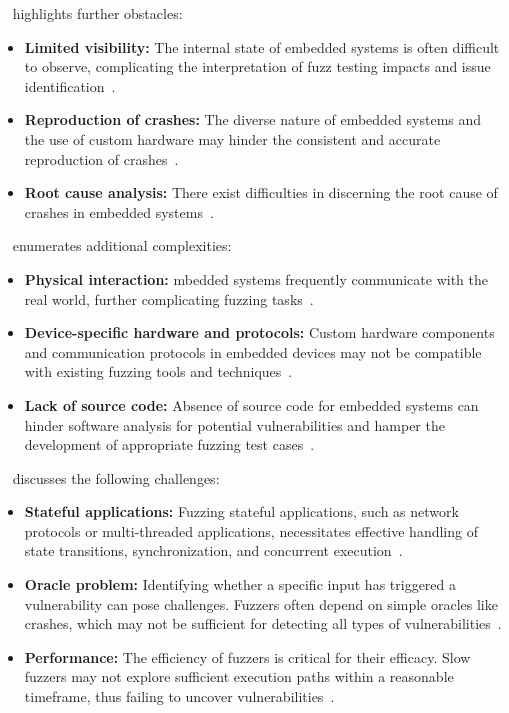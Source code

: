 ~ highlights further obstacles:
\begin{itemize}
\item \textbf{Limited visibility:} The internal state of embedded systems is often difficult to observe, complicating the interpretation of fuzz testing impacts and issue identification~\cite{muench2018you}.
\item \textbf{Reproduction of crashes:} The diverse nature of embedded systems and the use of custom hardware may hinder the consistent and accurate reproduction of crashes~\cite{muench2018you}.
\item \textbf{Root cause analysis:} There exist difficulties in discerning the root cause of crashes in embedded systems~\cite{muench2018you}.
\end{itemize}

~ enumerates additional complexities:
\begin{itemize}
\item \textbf{Physical interaction:} mbedded systems frequently communicate with
the real world, further complicating fuzzing tasks~\cite{eisele2022embedded}.
\item \textbf{Device-specific hardware and protocols:} Custom hardware components and communication protocols in embedded devices may not be compatible with existing fuzzing tools and techniques~\cite{eisele2022embedded}.
\item \textbf{Lack of source code:} Absence of source code for embedded systems can hinder software analysis for potential vulnerabilities and hamper the development of appropriate fuzzing test cases~\cite{eisele2022embedded}.
\end{itemize}

~ discusses the following challenges:
\begin{itemize}
\item \textbf{Stateful applications:} Fuzzing stateful applications, such as network protocols or multi-threaded applications, necessitates effective handling of state transitions, synchronization, and concurrent execution~\cite{manes2019art}.
\item \textbf{Oracle problem:} Identifying whether a specific input has triggered a vulnerability can pose challenges. Fuzzers often depend on simple oracles like crashes, which may not be sufficient for detecting all types of vulnerabilities~\cite{manes2019art}.
\item \textbf{Performance:} The efficiency of fuzzers is critical for their efficacy. Slow fuzzers may not explore sufficient execution paths within a reasonable timeframe, thus failing to uncover vulnerabilities~\cite{manes2019art}.
\end{itemize}

